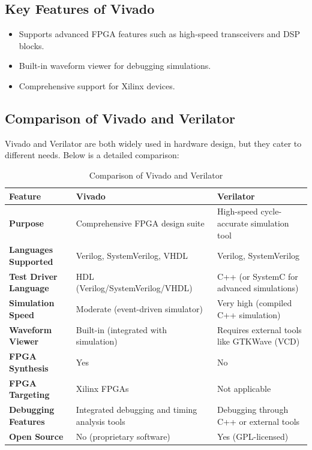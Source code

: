 \subsection{Key Features of Vivado}
\begin{itemize}
    \item Supports advanced FPGA features such as high-speed transceivers and DSP blocks.
    \item Built-in waveform viewer for debugging simulations.
    \item Comprehensive support for Xilinx devices.
\end{itemize}

\subsection{Comparison of Vivado and Verilator}
Vivado and Verilator are both widely used in hardware design, but they cater to different needs. Below is a detailed comparison:

\begin{table}[htbp]
\renewcommand{\arraystretch}{2} %
\centering
\begin{tabular}{@{}p{4cm}p{6cm}p{6cm}@{}}
\toprule
\textbf{Feature}              & \textbf{Vivado}                                & \textbf{Verilator}                              \\ \midrule
\textbf{Purpose}              & Comprehensive FPGA design suite                & High-speed cycle-accurate simulation tool       \\
\textbf{Languages Supported}  & Verilog, SystemVerilog, VHDL                   & Verilog, SystemVerilog                         \\
\textbf{Test Driver Language} & HDL (Verilog/SystemVerilog/VHDL)               & C++ (or SystemC for advanced simulations)      \\
\textbf{Simulation Speed}     & Moderate (event-driven simulator)              & Very high (compiled C++ simulation)            \\
\textbf{Waveform Viewer}      & Built-in (integrated with simulation)          & Requires external tools like GTKWave (VCD)     \\
\textbf{FPGA Synthesis}       & Yes                                           & No                                             \\
\textbf{FPGA Targeting}       & Xilinx FPGAs                                   & Not applicable                                 \\
\textbf{Debugging Features}   & Integrated debugging and timing analysis tools & Debugging through C++ or external tools        \\
\textbf{Open Source}          & No (proprietary software)                      & Yes (GPL-licensed)                             \\ \bottomrule
\end{tabular}
\caption{Comparison of Vivado and Verilator}
\label{tab:vivado_vs_verilator}
\end{table}

